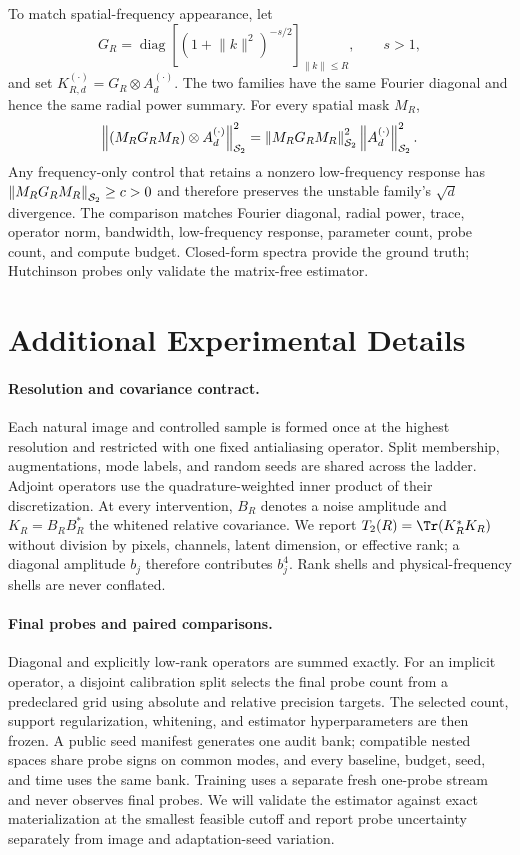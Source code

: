 To match spatial-frequency appearance, let
\begin{equation}
  G_R=\operatorname{diag}\left[
    (1+\lVert k\rVert^2)^{-s/2}
  \right]_{\lVert k\rVert\le R},
  \qquad s>1,
\end{equation}
and set $K_{R,d}^{(\cdot)}=G_R\otimes A_d^{(\cdot)}$. The two families have
the same Fourier diagonal and hence the same radial power summary. For every
spatial mask $M_R$,
\begin{equation}
  \left\lVert (M_RG_RM_R)\otimes A_d^{(\cdot)} \right\rVert_{\mathcal{S}_{2}}^2
  =\left\lVert M_RG_RM_R \right\rVert_{\mathcal{S}_{2}}^2\left\lVert A_d^{(\cdot)} \right\rVert_{\mathcal{S}_{2}}^2.
\end{equation}
Any frequency-only control that retains a nonzero low-frequency response has
$\left\lVert M_RG_RM_R \right\rVert_{\mathcal{S}_{2}}\ge c>0$ and therefore preserves the unstable family's
$\sqrt d$ divergence. The comparison matches Fourier diagonal, radial power,
trace, operator norm, bandwidth, low-frequency response, parameter count,
probe count, and compute budget. Closed-form spectra provide the ground truth;
Hutchinson probes only validate the matrix-free estimator.


\section{Additional Experimental Details}
\label{app:experimental-details}

\paragraph{Resolution and covariance contract.}
Each natural image and controlled sample is formed once at the highest
resolution and restricted with one fixed antialiasing operator. Split
membership, augmentations, mode labels, and random seeds are shared across the
ladder. Adjoint operators use the quadrature-weighted inner product of their
discretization. At every intervention, $B_R$ denotes a noise amplitude and
$K_R=B_RB_R^\ast$ the whitened relative covariance. We report
$\Ttwo(R)=\Tr(K_R^\ast K_R)$ without division by pixels, channels, latent
dimension, or effective rank; a diagonal amplitude $b_j$ therefore contributes
$b_j^4$. Rank shells and physical-frequency shells are never conflated.

\paragraph{Final probes and paired comparisons.}
Diagonal and explicitly low-rank operators are summed exactly. For an implicit
operator, a disjoint calibration split selects the final probe count from a
predeclared grid using absolute and relative precision targets. The selected
count, support regularization, whitening, and estimator hyperparameters are
then frozen. A public seed manifest generates one audit bank; compatible nested
spaces share probe signs on common modes, and every baseline, budget, seed, and
time uses the same bank. Training uses a separate fresh one-probe stream and
never observes final probes. We will validate the estimator against exact
materialization at the smallest feasible cutoff and report probe uncertainty
separately from image and adaptation-seed variation.

